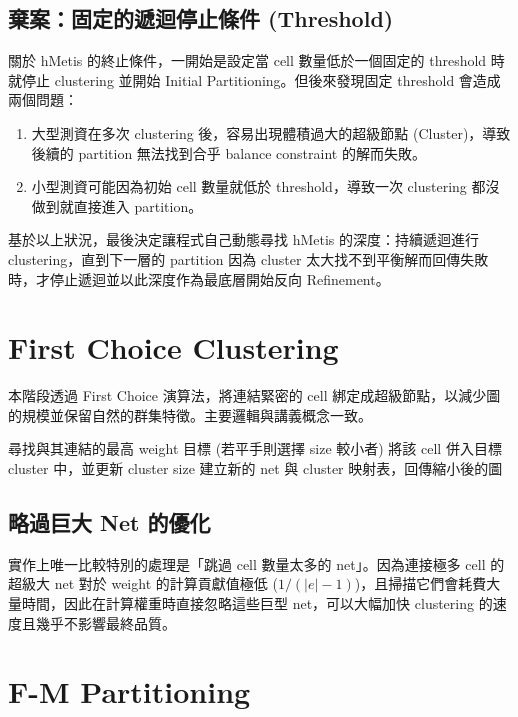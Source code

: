 \documentclass[12pt]{article}
\begin{document}
\subsection{棄案：固定的遞迴停止條件 (Threshold)}
關於 hMetis 的終止條件，一開始是設定當 cell 數量低於一個固定的 threshold 時就停止 clustering 並開始 Initial Partitioning。但後來發現固定 threshold 會造成兩個問題：
\begin{enumerate}
    \item 大型測資在多次 clustering 後，容易出現體積過大的超級節點 (Cluster)，導致後續的 partition 無法找到合乎 balance constraint 的解而失敗。
    \item 小型測資可能因為初始 cell 數量就低於 threshold，導致一次 clustering 都沒做到就直接進入 partition。
\end{enumerate}
基於以上狀況，最後決定讓程式自己動態尋找 hMetis 的深度：持續遞迴進行 clustering，直到下一層的 partition 因為 cluster 太大找不到平衡解而回傳失敗時，才停止遞迴並以此深度作為最底層開始反向 Refinement。

\section{First Choice Clustering}

本階段透過 First Choice 演算法，將連結緊密的 cell 綁定成超級節點，以減少圖的規模並保留自然的群集特徵。主要邏輯與講義概念一致。

\begin{algorithm}[H]
\caption{First Choice Clustering}
\begin{algorithmic}[1]
    \State 尋找與其連結的最高 weight 目標 (若平手則選擇 size 較小者)
    \State 將該 cell 併入目標 cluster 中，並更新 cluster size
\EndFor
\State 建立新的 net 與 cluster 映射表，回傳縮小後的圖
\end{algorithmic}
\end{algorithm}

\subsection{略過巨大 Net 的優化}
實作上唯一比較特別的處理是「跳過 cell 數量太多的 net」。因為連接極多 cell 的超級大 net 對於 weight 的計算貢獻值極低 ($1 / (|e|-1)$)，且掃描它們會耗費大量時間，因此在計算權重時直接忽略這些巨型 net，可以大幅加快 clustering 的速度且幾乎不影響最終品質。

\section{F-M Partitioning}
\end{document}
